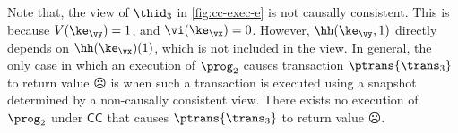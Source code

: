 Note that, the view of $\thid_3$ in \cref{fig:cc-exec-e} is not causally consistent.
This is because $V(\ke_{\vy}) = 1$, and $\vi(\ke_{\vx}) = 0$. However, $\hh(\ke_{\vy},1)$ directly depends 
on $\hh(\ke_{\vx})(1)$, which is not included in the view. 
In general, the only case in which an execution of $\prog_2$ causes transaction $\ptrans{\trans_3}$ to return value $\sadface$ is when such a transaction is executed using a snapshot determined by a non-causally consistent view. 
There exists no execution of $\prog_2$ under $\mathsf{CC}$ that causes $\ptrans{\trans_3}$ to return value $\sadface$.


%
